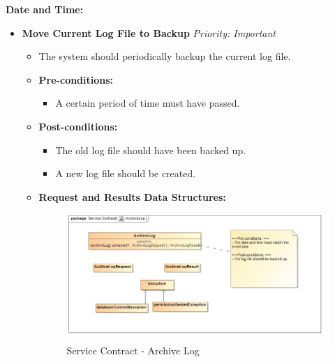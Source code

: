 \documentclass{article}
\begin{document}
				\textbf{Date and Time:}
				\begin{itemize}
					\item \textbf{Move Current Log File to Backup} \hfill \textit{Priority: Important}
					\begin{itemize}
						\item The system should periodically backup the current log file.
						\item \textbf{Pre-conditions:}
						\begin{itemize}
							\item A certain period of time must have passed.
						\end{itemize}
						\item \textbf{Post-conditions:}
						\begin{itemize}
							\item The old log file should have been backed up.
							\item A new log file should be created.
						\end{itemize}
						\item \textbf{Request and Results Data Structures:}
						\begin{figure}[H]
							\includegraphics[width=\linewidth]{../Diagrams/ServiceContracts/Logging subsystem/ArchiveLog.jpg}
							\caption{Service Contract - Archive Log}
						\end{figure}
					\end{itemize}
					

\end{itemize}
\end{document}
